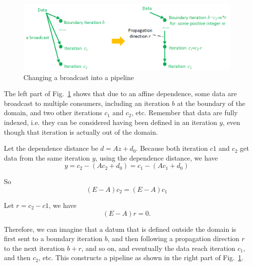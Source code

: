 \begin{figure}[!ht]
    \centering
    \includegraphics[width=\textwidth]{./img/broadcast-to-pipeline.png}
    \caption{Changing a broadcast into a pipeline}
    \label{fig:broadcast-to-pipeline}
\end{figure}

The left part of Fig.~\ref{fig:broadcast-to-pipeline} shows that due to an affine dependence, some data are broadcast to multiple consumers, including an iteration $b$ at the boundary of the domain, and two other iterations $c_1$ and $c_2$, etc. Remember that data are fully indexed, i.e. they can be considered having been defined in an iteration $y$, even though that iteration is actually out of the domain. 

Let the dependence distance be $d=Az+d_0$.  Because both iteration $c1$ and $c_2$ get data from the same iteration $y$, using the  dependence distance, we have
\begin{equation}
y = c_2 - (Ac_2+d_0) = c_1 - (Ac_1+d_0)
\end{equation}

So
\begin{equation}
(E-A)c_2 = (E-A)c_1    
\end{equation}

Let $r=c_2-c1$, we have
\begin{equation}
(E-A)r = 0.
\end{equation}

Therefore, we can imagine that a datum that is defined outside the domain is first sent to a boundary iteration $b$, and then following a propagation direction $r$ to the next iteration $b+r$, and so on, and eventually the data reach iteration $c_1$, and then $c_2$, etc. This constructs a pipeline as shown in the right part of Fig.~\ref{fig:broadcast-to-pipeline}.


